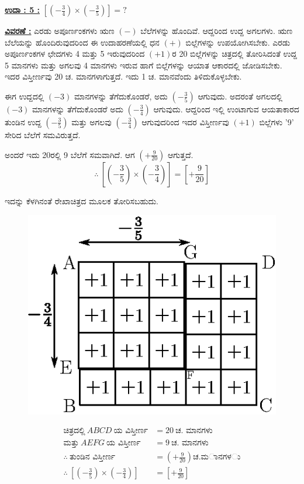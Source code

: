 \noindent
{\textbf{\underline{ಉದಾ : 5 :}}} $\left[\left(-\frac{3}{4} \right) \times \left(-\frac{3}{5} \right) \right] = ?$

\noindent
{\textbf{\underline{ವಿವರಣೆ :}}} ಎರಡು ಅಪೂರ್ಣಂಕಗಳು ಋಣ $(-)$ ಬೆಲೆಗಳನ್ನು ಹೊಂದಿವೆ. ಆದ್ದರಿಂದ ಉದ್ದ ಅಗಲಗಳು. ಋಣ ಬೆಲೆಯನ್ನು ಹೊಂದಿರುವುದರಿಂದ ಈ ಉದಾಹರಣೆಯಲ್ಲಿ ಧನ $(+)$ ಬಿಲ್ಲೆಗಳನ್ನು ಉಪಯೋಗಿಸಬೇಕು. ಎರಡು ಅಪೂರ್ಣಂಕಗಳ ಛೇದಗಳು 4 ಮತ್ತು 5 ಇರುವುದರಿಂದ $(+1)$ರ 20 ಬಿಲ್ಲೆಗಳನ್ನು ಚಿತ್ರದಲ್ಲಿ ತೋರಿಸಿದಂತೆ ಉದ್ದ 5 ಮಾನಗಳು ಮತ್ತು ಅಗಲವು 4 ಮಾನಗಳು ಇರುವ ಹಾಗೆ ಬಿಲ್ಲೆಗಳನ್ನು ಆಯಾತ ಆಕಾರದಲ್ಲಿ ಜೋಡಿಸಬೇಕು. ಇದರ ವಿಸ್ತೀರ್ಣವು 20 ಚ. ಮಾನಗಳಾಗುತ್ತದೆ. ಇದು 1 ಚ. ಮಾನವೆಂದು ತಿಳಿದುಕೊಳ್ಳ\break ಬೇಕು. 

ಈಗ ಉದ್ದದಲ್ಲಿ $(-3)$ ಮಾನಗಳನ್ನು ತೆಗೆದುಕೊಂಡರೆ, ಅದು $\left(-\frac{3}{5}\right)$ ಆಗುವುದು. ಅದರಂತೆ ಅಗಲದಲ್ಲಿ $(-3)$ ಮಾನಗಳನ್ನು ತೆಗೆದುಕೊಂಡರೆ ಅದು $\left(-\frac{3}{4} \right)$ ಆಗುವುದು. ಆದ್ದರಿಂದ ಇಲ್ಲಿ ಉಂಟಾಗುವ ಆಯತಾಕಾರದ ತುಂಡಿನ ಉದ್ದ $\left(-\frac{3}{5} \right)$ ಮತ್ತು ಅಗಲವು $\left(-\frac{3}{4}\right)$ ಆಗುವುದರಿಂದ ಇದರ ವಿಸ್ತೀರ್ಣವು $(+1)$ ಬಿಲ್ಲೆಗಳು '9' ಸೇರಿದ ಬೆಲೆಗೆ ಸಮ\-ವಿರುತ್ತದೆ.

ಅಂದರೆ ಇದು 20ರಲ್ಲಿ 9 ಬೆಲೆಗೆ ಸಮವಾಗಿದೆ. ಆಗ $\left(+\frac{9}{20} \right)$ ಆಗುತ್ತದೆ. 
$$
\therefore~ \left[\left(-\frac{3}{5}\right) \times \left(-\frac{3}{4}\right) \right] = \left[+\frac{9}{20} \right]
$$

ಇದನ್ನು ಕೆಳಗಿನಂತೆ ರೇಖಾಚಿತ್ರದ ಮೂಲಕ ತೋರಿಸಬಹುದು. 
\begin{figure}[H]
\centering
\includegraphics[scale=0.7]{src/figure/chap3/fig3-27b.eps}
\end{figure}
\vskip -1.2cm
\begin{align*}
\text{ಚಿತ್ರದಲ್ಲಿ}~ ABCD ~\text{ಯ ವಿಸ್ತೀರ್ಣ} & = 20~ \text{ಚ. ಮಾನಗಳು}\\
\text{ಮತ್ತು}~ AEFG ~\text{ಯ ವಿಸ್ತೀರ್ಣ} & = 9~ \text{ಚ. ಮಾನಗಳು}\\
\therefore~ \text{ತುಂಡಿನ ವಿಸ್ತೀರ್ಣ} & = \left(+\frac{9}{20} \right) ಚ. ಮಾನಗಳು\\
\therefore~ \left[\left(-\frac{3}{5}\right) \times \left(-\frac{3}{4}\right) \right] & = \left[+ \frac{9}{20} \right]
\end{align*}

